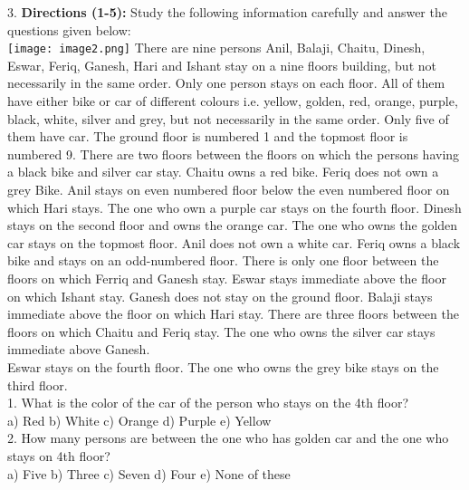 \documentclass[
]{article}
\begin{document}
3. \textbf{Directions (1-5):} Study the following information carefully and answer the questions given
below:\\
\texttt{[image: image2.png]}
There are nine persons Anil, Balaji, Chaitu, Dinesh, Eswar, Feriq, Ganesh, Hari and Ishant
stay on a nine floors building, but not necessarily in the same order. Only one person stays
on each floor. All of them have either bike or car of different colours i.e. yellow, golden, red,
orange, purple, black, white, silver and grey, but not necessarily in the same order. Only
five of them have car. The ground floor is numbered 1 and the topmost floor is numbered 9.
There are two floors between the floors on which the persons having a black bike and silver
car stay. Chaitu owns a red bike. Feriq does not own a grey Bike. Anil stays on even
numbered floor below the even numbered floor on which Hari stays. The one who own a
purple car stays on the fourth floor. Dinesh stays on the second floor and owns the orange
car. The one who owns the golden car stays on the topmost floor. Anil does not own a white
car. Feriq owns a black bike and stays on an odd-numbered floor. There is only one floor
between the floors on which Ferriq and Ganesh stay. Eswar stays immediate above the floor
on which Ishant stay. Ganesh does not stay on the ground floor. Balaji stays immediate
above the floor on which Hari stay. There are three floors between the floors on which
Chaitu and Feriq stay. The one who owns the silver car stays immediate above Ganesh.\\
Eswar stays on the fourth floor. The one who owns the grey bike stays on the third floor.\\

1. What is the color of the car of the person who stays on the 4th floor?\\
a) Red \hspace{2mm}b) White \hspace{2mm}c) Orange \hspace{2mm}d) Purple \hspace{2mm}e) Yellow\\

2. How many persons are between the one who has golden car and the one who stays on
4th floor?\\
a) Five \hspace{2mm}b) Three \hspace{2mm}c) Seven \hspace{2mm}d) Four \hspace{2mm}e) None of these\\
\end{document}
